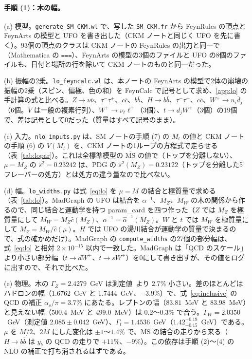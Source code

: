 \documentclass[a4paper,10pt]{ltjsarticle}
\newcommand{\MSbar}{\overline{\mathrm{MS}}}
\begin{document}
\paragraph{手順 (1)：木の幅。}(a) 模型。\texttt{generate\_SM\_CKM.wl} で、写した \texttt{SM\_CKM.fr} から FeynRules の頂点と FeynArts の模型と UFO を書き出した（CKM ノートと同じく UFO を先に書く）。93個の頂点のクラスは CKM ノートの FeynRules の出力と同一で（Mathematica の \texttt{===}）、FeynArts の模型の3個のファイルと UFO の8個のファイルも、日付と場所の行を除いて CKM ノートのものと同一だった。

(b) 振幅の2乗。\texttt{lo\_feyncalc.wl} は、本ノートの FeynArts の模型で2体の崩壊の振幅の2乗（スピン、偏極、色の和）を FeynCalc で記号として求め、\ref{app:lo} の手計算の式と比べる。$Z\to\nu\bar\nu$、$\tau^-\tau^+$、$c\bar c$、$b\bar b$、$H\to b\bar b$、$\tau^-\tau^+$、$c\bar c$、$W^+\to u_i\bar d_j$（6個。$V$ は一般の複素行列）、$W^+\to\nu_\ell\ell^+$（3個）、$t\to d_jW^+$（3個）の19個で、差は記号として0だった（質量はすべて記号のまま）。

(c) 入力。\texttt{nlo\_inputs.py} は、SM ノートの手順 (7) の $M_t$ の値と CKM ノートの手順 (6) の $V(M_t)$ を、CKM ノートの1ループの方程式で走らせる（表~\ref{tab:lopar}）。これは全標準模型の $\MSbar$ の値で（トップを分離しない）、$\mu=M_Z$ の $\hat s^2=0.23242$ は、PDG の $\hat s^2(M_Z)=0.23122$（トップを分離した5フレーバーの処方）とは処方の違う量なので比べない。

(d) 幅。\texttt{lo\_widths.py} は式~\eqref{eq:lo} を $\mu=M$ の結合と極質量で求める（表~\ref{tab:lo}）。MadGraph の UFO は結合を $\alpha^{-1}$、$M_Z$、$M_W$ の木の関係から作るので、同じ結合と運動学を持つ param\_card を四つ作った（$Z$ では $M_Z$ を極質量にして $M_W=M_Z\hat c(M_Z)$、$\alpha^{-1}=\hat\alpha^{-1}(M_Z)$。$W$ と $t$ では $M_W$ を極質量にして $M_Z=M_W/\hat c(\mu)$。$H$ では UFO の湯川結合が運動学の質量で決まるので、式の確かめだけ）。MadGraph の \texttt{compute\_widths} の27個の部分幅は、式~\eqref{eq:lo} と相対 $2\times10^{-15}$ 以内で一致した。MadGraph は「QCD のスケール」より小さい部分幅（$t\to dW^+$、$t\to sW^+$）を0にして書き出すが、その値をログに出すので、それで比べた。

(e) 物理。木の $\Gamma_Z=2.4279$~GeV は測定値~\cite{pdg24}より $2.7\%$ 小さい。差のほとんどはハドロンの幅（1.6762~GeV と 1.7444~GeV、$-3.9\%$）で、式~\eqref{eq:inclusive} の QCD の補正 $\alpha_s/\pi=3.7\%$ にあたる。レプトンの幅（$83.81$~MeV と $83.98$~MeV）と見えない幅（$500.4$~MeV と $499.0$~MeV）は $0.2$〜$0.3\%$ で合う。$\Gamma_W=2.0350$~GeV（測定値 $2.085\pm0.042$~GeV）、$\Gamma_t=1.4536$~GeV（$1.42^{+0.19}_{-0.15}$~GeV）である。$\mu$ を $M/2$、$2M$ にした変化は $\pm1$〜$1.4\%$ で、$\MSbar$ の結合の走りから来る（$H\to b\bar b$ は $y_b$ の QCD の走りで $+11\%$、$-9\%$）。この依存は手順 (2)〜(4) の NLO の補正で打ち消されるはずである。
\end{document}
